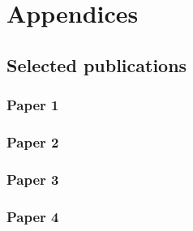\documentclass[10pt, twoside, a4paper, openright]{report}
\newcommand{\valenta}{Ing. Petr Valenta}
\begin{document}





%
%


\part*{Appendices}

\appendix

\chapter{Selected publications}
%

\section{Paper 1}

\section{Paper 2}

\section{Paper 3}

\section{Paper 4}

%

%
\end{document}
